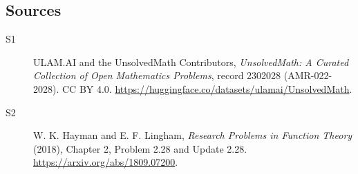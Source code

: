 \documentclass[11pt]{article}
\begin{document}
\subsection{Sources}
\begin{description}
\item[\hypertarget{source:2302028:1}{S1}] ULAM.AI and the UnsolvedMath Contributors, \emph{UnsolvedMath: A Curated Collection of Open Mathematics Problems}, record 2302028 (AMR-022-2028). CC BY 4.0. \url{https://huggingface.co/datasets/ulamai/UnsolvedMath}.
\item[\hypertarget{source:2302028:2}{S2}] W. K. Hayman and E. F. Lingham, \emph{Research Problems in Function Theory} (2018), Chapter 2, Problem 2.28 and Update 2.28. \url{https://arxiv.org/abs/1809.07200}.
\end{description}
\label{end:2302028}
\end{document}
